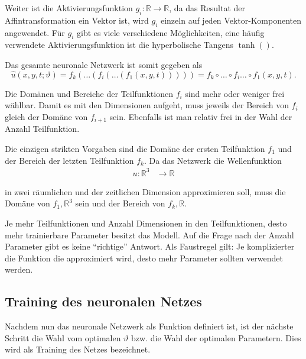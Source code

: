 Weiter ist die Aktivierungsfunktion \( g_i\colon \mathbb{R} \longrightarrow\mathbb{R} \), da das Resultat der Affintransformation ein Vektor ist, wird \( g_i \) einzeln auf jeden Vektor-Komponenten angewendet.
Für \( g_i \) gibt es viele verschiedene Möglichkeiten, eine häufig verwendete Aktivierungsfunktion ist die hyperbolische Tangens \( \tanh() \).

Das gesamte neuronale Netzwerk ist somit gegeben als
\begin{equation}
    \hat{u}(x, y, t; \vartheta) = f_k(\ldots(f_i(\ldots(f_1(x, y, t))))) = f_k \circ \ldots \circ f_i \ldots \circ f_1(x, y, t).
    \label{neuronal:nn_ausformuliert}
\end{equation}

Die Domänen und Bereiche der Teilfunktionen \( f_i \) sind mehr oder weniger frei wählbar.
Damit es mit den Dimensionen aufgeht, muss jeweils der Bereich von \( f_i \) gleich der Domäne von \( f_{i+1} \) sein.
Ebenfalls ist man relativ frei in der Wahl der Anzahl Teilfunktion.

Die einzigen strikten Vorgaben sind die Domäne der ersten Teilfunktion \( f_1 \) und der Bereich der letzten Teilfunktion \( f_k \).
Da das Netzwerk die Wellenfunktion
\begin{align*}
    u\colon \mathbb{R}^3 & \longrightarrow\mathbb{R}
\end{align*}

in zwei räumlichen und der zeitlichen Dimension approximieren soll, muss die Domäne von \( f_1, \mathbb{R}^3\) sein und der Bereich von \( f_k, \mathbb{R}\).

Je mehr Teilfunktionen und Anzahl Dimensionen in den Teilfunktionen, desto mehr trainierbare Parameter besitzt das Modell.
Auf die Frage nach der Anzahl Parameter gibt es keine ``richtige'' Antwort.
Als Faustregel gilt: Je komplizierter die Funktion die approximiert wird, desto mehr Parameter sollten verwendet werden.



\subsection{Training des neuronalen Netzes}\label{neuronal:subsection:training_nn}

Nachdem nun das neuronale Netzwerk als Funktion definiert ist, ist der nächste Schritt die Wahl vom optimalen \( \vartheta \) bzw. die Wahl der optimalen Parametern.
Dies wird als Training des Netzes bezeichnet.

